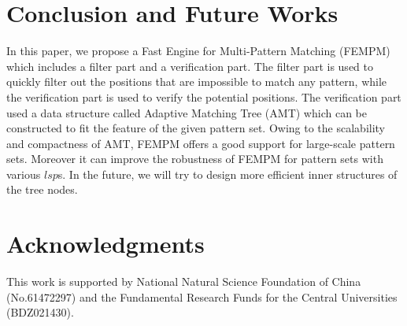 \documentclass{article}
\begin{document}
\section{Conclusion and Future Works}
\label{sec:conclusion}

In this paper, we propose a Fast Engine for Multi-Pattern Matching
(\textsf{FEMPM}) which includes a filter part and a verification
part. The filter part is used to quickly filter out the positions that
are impossible to match any pattern, while the verification part is
used to verify the potential positions. The verification part used a
data structure called Adaptive Matching Tree (AMT) which can be
constructed to fit the feature of the given pattern set. Owing to the
scalability and compactness of AMT, \textsf{FEMPM} offers a good
support for large-scale pattern sets. Moreover it can improve the
robustness of \textsf{FEMPM} for pattern sets with various $lsp$s. In
the future, we will try to design more efficient inner structures of
the tree nodes.

\section{Acknowledgments}

This work is supported by National Natural Science Foundation of China
(No.61472297) and the Fundamental Research Funds for the Central
Universities (BDZ021430).
\end{document}
